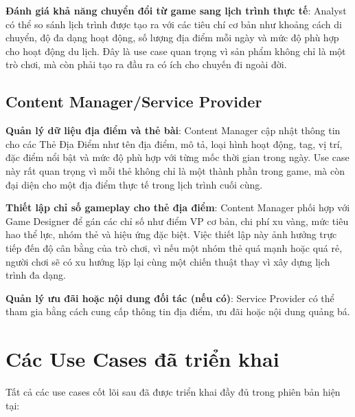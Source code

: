 \textbf{Đánh giá khả năng chuyển đổi từ game sang lịch trình thực tế}: Analyst có thể so sánh lịch trình được tạo ra với các tiêu chí cơ bản như khoảng cách di chuyển, độ đa dạng hoạt động, số lượng địa điểm mỗi ngày và mức độ phù hợp cho hoạt động du lịch. Đây là use case quan trọng vì sản phẩm không chỉ là một trò chơi, mà còn phải tạo ra đầu ra có ích cho chuyến đi ngoài đời.

\subsection{Content Manager/Service Provider}

\textbf{Quản lý dữ liệu địa điểm và thẻ bài}: Content Manager cập nhật thông tin cho các Thẻ Địa Điểm như tên địa điểm, mô tả, loại hình hoạt động, tag, vị trí, đặc điểm nổi bật và mức độ phù hợp với từng mốc thời gian trong ngày. Use case này rất quan trọng vì mỗi thẻ không chỉ là một thành phần trong game, mà còn đại diện cho một địa điểm thực tế trong lịch trình cuối cùng.

\textbf{Thiết lập chỉ số gameplay cho thẻ địa điểm}: Content Manager phối hợp với Game Designer để gán các chỉ số như điểm VP cơ bản, chi phí xu vàng, mức tiêu hao thể lực, nhóm thẻ và hiệu ứng đặc biệt. Việc thiết lập này ảnh hưởng trực tiếp đến độ cân bằng của trò chơi, vì nếu một nhóm thẻ quá mạnh hoặc quá rẻ, người chơi sẽ có xu hướng lặp lại cùng một chiến thuật thay vì xây dựng lịch trình đa dạng.

\textbf{Quản lý ưu đãi hoặc nội dung đối tác (nếu có)}: Service Provider có thể tham gia bằng cách cung cấp thông tin địa điểm, ưu đãi hoặc nội dung quảng bá.

\section{Các Use Cases đã triển khai}

Tất cả các use cases cốt lõi sau đã được triển khai đầy đủ trong phiên bản hiện tại:

